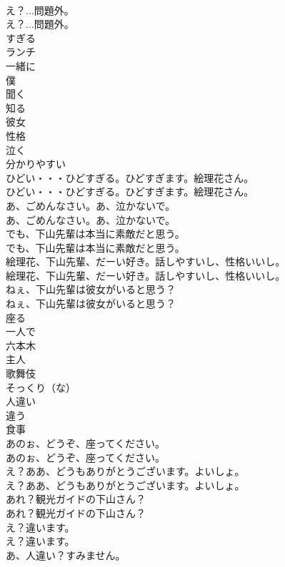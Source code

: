 \documentclass[8pt]{extreport}
\begin{document}
\begin{CJK}{UTF8}{min}
\\	え？...問題外。	
\\	え？...問題外。 
\\	すぎる
\\	ランチ
\\	一緒に
\\	僕
\\	聞く
\\	知る
\\	彼女
\\	性格
\\	泣く
\\	分かりやすい
\\	ひどい・・・ひどすぎる。ひどすぎます。絵理花さん。	
\\	ひどい・・・ひどすぎる。ひどすぎます。絵理花さん。 
\\	あ、ごめんなさい。あ、泣かないで。	
\\	あ、ごめんなさい。あ、泣かないで。 
\\	でも、下山先輩は本当に素敵だと思う。	
\\	でも、下山先輩は本当に素敵だと思う。 
\\	絵理花、下山先輩、だーい好き。話しやすいし、性格いいし。	
\\	絵理花、下山先輩、だーい好き。話しやすいし、性格いいし。 
\\	ねぇ、下山先輩は彼女がいると思う？	
\\	ねぇ、下山先輩は彼女がいると思う？ 
\\	座る
\\	一人で
\\	六本木
\\	主人
\\	歌舞伎
\\	そっくり（な）
\\	人違い
\\	違う
\\	食事
\\	あのぉ、どうぞ、座ってください。	
\\	あのぉ、どうぞ、座ってください。 
\\	え？ああ、どうもありがとうございます。よいしょ。	
\\	え？ああ、どうもありがとうございます。よいしょ。 
\\	あれ？観光ガイドの下山さん？	
\\	あれ？観光ガイドの下山さん？ 
\\	え？違います。	
\\	え？違います。 
\\	あ、人違い？すみません。	

\end{CJK}
\end{document}
